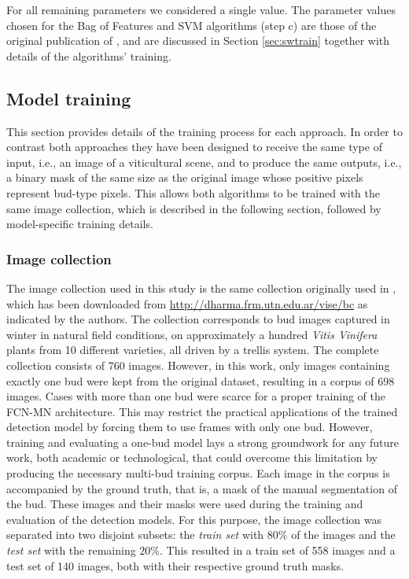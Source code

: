 \documentclass[a4paper,authoryear,review]{elsarticle}
\begin{document}
For all remaining parameters we considered a single value. The parameter values chosen for the Bag of Features and SVM algorithms (step c) are those of the original publication of \citet{perez2017image}, and are discussed in Section \ref{sec:swtrain} together with details of the algorithms’ training.


\subsection{Model training}
\label{sec:train}

This section provides details of the training process for each approach. In order to contrast both approaches they have been designed to receive the same type of input, i.e., an image of a viticultural scene, and to produce the same outputs, i.e., a binary mask of the same size as the original image whose positive pixels represent bud-type pixels. This allows both algorithms to be trained with the same image collection, which is described in the following section, followed by model-specific training details.

\subsubsection{Image collection}
\label{sec:collection}

The image collection used in this study is the same collection originally used in \citet{perez2017image}, which has been downloaded from \url{
http://dharma.frm.utn.edu.ar/vise/bc} as indicated by the authors. 
The collection corresponds to bud images captured in winter in natural field conditions, on approximately a hundred \emph{Vitis Vinifera} plants from 10 different varieties, all driven by a trellis system. The complete collection consists of 760 images. 
However, in this work, only images containing exactly one bud were kept from the original dataset, resulting in a corpus of 698 images. Cases with more than one bud were scarce for a proper training of the FCN-MN architecture. This may restrict the practical applications of the trained detection model by forcing them to use frames with only one bud. However, training and evaluating a one-bud model lays a strong groundwork for any future work, both academic or technological, that could overcome this limitation by producing the necessary multi-bud training corpus. 
%
Each image in the corpus is accompanied by the ground truth, that is, a mask of the manual segmentation of the bud. These images and their masks were used during the training and evaluation of the detection models. For this purpose, the image collection was separated into two disjoint subsets: the \emph{train set} with $80\%$ of the images and the \emph{test set} with the remaining $20\%$. This resulted in a train set of 558 images and a test set of 140 images, both with their respective ground truth masks.
\end{document}
